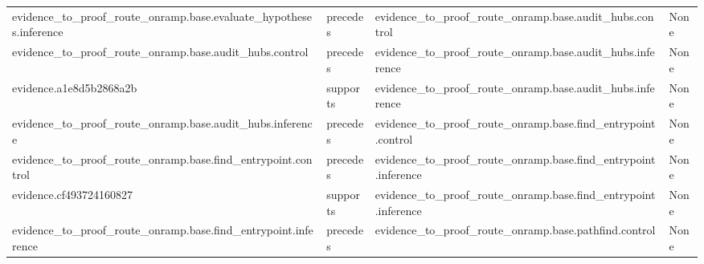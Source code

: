 \documentclass[10pt,a4paper]{article}
\begin{document}
\begin{longtable}{@{}>{\raggedright\arraybackslash}p{.24\linewidth}>{\raggedright\arraybackslash}p{.12\linewidth}>{\raggedright\arraybackslash}p{.24\linewidth}>{\raggedright\arraybackslash}p{.20\linewidth}@{}}
evidence\_\allowbreak{}to\_\allowbreak{}proof\_\allowbreak{}route\_\allowbreak{}onramp.\allowbreak{}base.\allowbreak{}evaluate\_\allowbreak{}hypotheses\allowbreak{}.\allowbreak{}inference & precedes & evidence\_\allowbreak{}to\_\allowbreak{}proof\_\allowbreak{}route\_\allowbreak{}onramp.\allowbreak{}base.\allowbreak{}audit\_\allowbreak{}hubs.\allowbreak{}control & None\\
evidence\_\allowbreak{}to\_\allowbreak{}proof\_\allowbreak{}route\_\allowbreak{}onramp.\allowbreak{}base.\allowbreak{}audit\_\allowbreak{}hubs.\allowbreak{}control & precedes & evidence\_\allowbreak{}to\_\allowbreak{}proof\_\allowbreak{}route\_\allowbreak{}onramp.\allowbreak{}base.\allowbreak{}audit\_\allowbreak{}hubs.\allowbreak{}inference & None\\
evidence.\allowbreak{}a1e8d5b286\allowbreak{}8a2b & supports & evidence\_\allowbreak{}to\_\allowbreak{}proof\_\allowbreak{}route\_\allowbreak{}onramp.\allowbreak{}base.\allowbreak{}audit\_\allowbreak{}hubs.\allowbreak{}inference & None\\
evidence\_\allowbreak{}to\_\allowbreak{}proof\_\allowbreak{}route\_\allowbreak{}onramp.\allowbreak{}base.\allowbreak{}audit\_\allowbreak{}hubs.\allowbreak{}inference & precedes & evidence\_\allowbreak{}to\_\allowbreak{}proof\_\allowbreak{}route\_\allowbreak{}onramp.\allowbreak{}base.\allowbreak{}find\_\allowbreak{}entrypoint\allowbreak{}.\allowbreak{}control & None\\
evidence\_\allowbreak{}to\_\allowbreak{}proof\_\allowbreak{}route\_\allowbreak{}onramp.\allowbreak{}base.\allowbreak{}find\_\allowbreak{}entrypoint\allowbreak{}.\allowbreak{}control & precedes & evidence\_\allowbreak{}to\_\allowbreak{}proof\_\allowbreak{}route\_\allowbreak{}onramp.\allowbreak{}base.\allowbreak{}find\_\allowbreak{}entrypoint\allowbreak{}.\allowbreak{}inference & None\\
evidence.\allowbreak{}cf49372416\allowbreak{}0827 & supports & evidence\_\allowbreak{}to\_\allowbreak{}proof\_\allowbreak{}route\_\allowbreak{}onramp.\allowbreak{}base.\allowbreak{}find\_\allowbreak{}entrypoint\allowbreak{}.\allowbreak{}inference & None\\
evidence\_\allowbreak{}to\_\allowbreak{}proof\_\allowbreak{}route\_\allowbreak{}onramp.\allowbreak{}base.\allowbreak{}find\_\allowbreak{}entrypoint\allowbreak{}.\allowbreak{}inference & precedes & evidence\_\allowbreak{}to\_\allowbreak{}proof\_\allowbreak{}route\_\allowbreak{}onramp.\allowbreak{}base.\allowbreak{}pathfind.\allowbreak{}control & None\\

\end{longtable}
\end{document}
